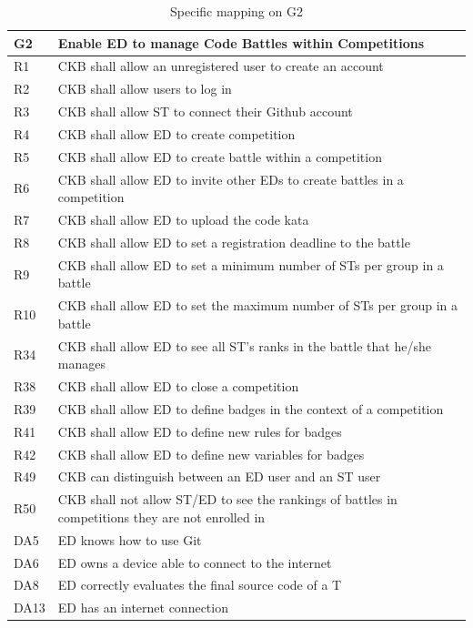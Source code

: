   \begin{table}[H]
    \begin{tabular}{|l|p{12cm}| }
      \hline
      \textbf{G2} & \textbf{Enable ED to manage Code Battles within Competitions}      \\
      \hline
      R1 & CKB shall allow an unregistered user to create an account \\
      \hline
      R2 & CKB shall allow users to log in \\
      \hline
      R3 & CKB shall allow ST to connect their Github account \\
      \hline
      R4 & CKB shall allow ED to create competition \\
      \hline
      R5 & CKB shall allow ED to create battle within a competition \\
      \hline
      R6 & CKB shall allow ED to invite other EDs to create battles in a competition \\
      \hline
      R7 & CKB shall allow ED to upload the code kata \\
      \hline
      R8 & CKB shall allow ED to set a registration deadline to the battle \\
      \hline
      R9 & CKB shall allow ED to set a minimum number of STs per group in a battle \\
      \hline
      R10 & CKB shall allow ED to set the maximum number of STs per group in a battle \\
      \hline
      R34 & CKB shall allow ED to see all ST’s ranks in the battle that he/she manages \\
      \hline
      R38 & CKB shall allow ED to close a competition \\
      \hline
      R39 & CKB shall allow ED to define badges in the context of a competition \\
      \hline
      R41 & CKB shall allow ED to define new rules for badges \\
      \hline
      R42 & CKB shall allow ED to define new variables for badges \\
      \hline
      R49 & CKB can distinguish between an ED user and an ST user \\
      \hline
      R50 & CKB shall not allow ST/ED to see the rankings of battles in competitions they are not enrolled in \\
      \hline
      DA5 & ED knows how to use Git \\
      \hline
      DA6 & ED owns a device able to connect to the internet \\
      \hline
      DA8 & ED correctly evaluates the final source code of a T \\
      \hline
      DA13 & ED has an internet connection \\
      \hline

    \end{tabular}
    \caption{Specific mapping on G2}
    \label{tab:mappingG2}
  \end{table}


